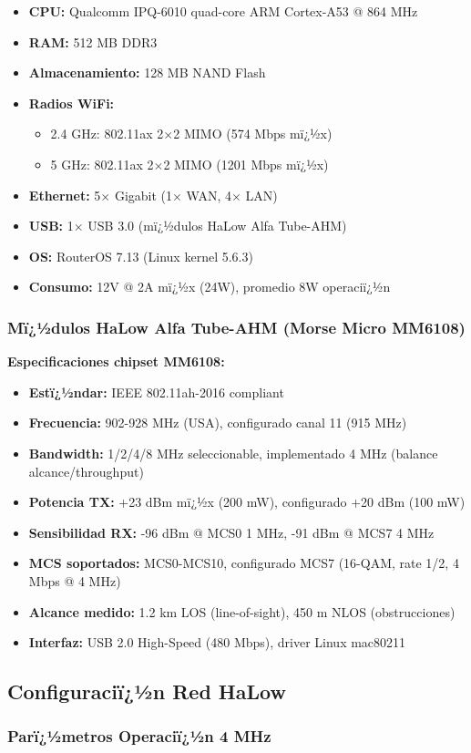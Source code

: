 \begin{itemize}\n    \item \textbf{CPU:} Qualcomm IPQ-6010 quad-core ARM Cortex-A53 @ 864 MHz\n    \item \textbf{RAM:} 512 MB DDR3\n    \item \textbf{Almacenamiento:} 128 MB NAND Flash\n    \item \textbf{Radios WiFi:} \n        \begin{itemize}\n        \item 2.4 GHz: 802.11ax 2$\times$2 MIMO (574 Mbps mï¿½x)\n        \item 5 GHz: 802.11ax 2$\times$2 MIMO (1201 Mbps mï¿½x)\n        \end{itemize}\n    \item \textbf{Ethernet:} 5$\times$ Gigabit (1$\times$ WAN, 4$\times$ LAN)\n    \item \textbf{USB:} 1$\times$ USB 3.0 (mï¿½dulos HaLow Alfa Tube-AHM)\n    \item \textbf{OS:} RouterOS 7.13 (Linux kernel 5.6.3)\n    \item \textbf{Consumo:} 12V @ 2A mï¿½x (24W), promedio 8W operaciï¿½n\n\end{itemize}\n\n\subsubsection{Mï¿½dulos HaLow Alfa Tube-AHM (Morse Micro MM6108)}\n\n\textbf{Especificaciones chipset MM6108:}\n\begin{itemize}\n    \item \textbf{Estï¿½ndar:} IEEE 802.11ah-2016 compliant\n    \item \textbf{Frecuencia:} 902-928 MHz (USA), configurado canal 11 (915 MHz)\n    \item \textbf{Bandwidth:} 1/2/4/8 MHz seleccionable, implementado 4 MHz (balance alcance/throughput)\n    \item \textbf{Potencia TX:} +23 dBm mï¿½x (200 mW), configurado +20 dBm (100 mW)\n    \item \textbf{Sensibilidad RX:} -96 dBm @ MCS0 1 MHz, -91 dBm @ MCS7 4 MHz\n    \item \textbf{MCS soportados:} MCS0-MCS10, configurado MCS7 (16-QAM, rate 1/2, 4 Mbps @ 4 MHz)\n    \item \textbf{Alcance medido:} 1.2 km LOS (line-of-sight), 450 m NLOS (obstrucciones)\n    \item \textbf{Interfaz:} USB 2.0 High-Speed (480 Mbps), driver Linux mac80211\n\end{itemize}\n\n\subsection{Configuraciï¿½n Red HaLow}\n\label{sec:impl-config-halow}\n\n\subsubsection{Parï¿½metros Operaciï¿½n 4 MHz}

